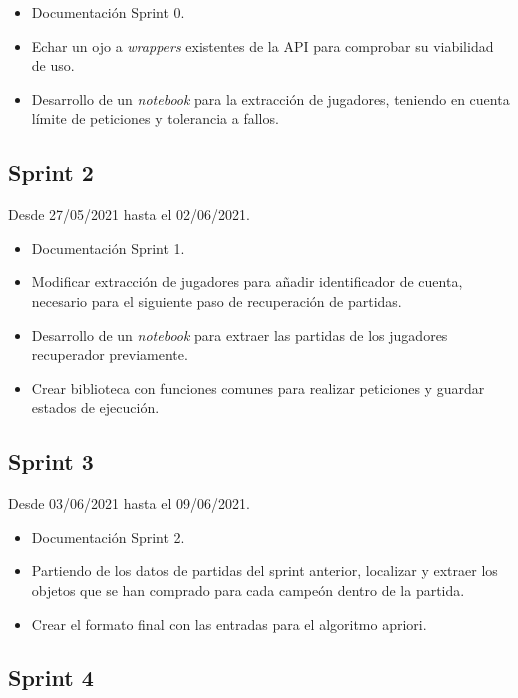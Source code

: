 \begin{itemize}
    \item Documentación Sprint 0.
    \item Echar un ojo a \textit{wrappers} existentes de la API para comprobar su viabilidad de uso.
    \item Desarrollo de un \textit{notebook} para la extracción de jugadores, teniendo en cuenta límite de peticiones y tolerancia a fallos.
\end{itemize}

\subsection{Sprint 2}

Desde 27/05/2021 hasta el 02/06/2021.

\begin{itemize}
    \item Documentación Sprint 1.
    \item Modificar extracción de jugadores para añadir identificador de cuenta, necesario para el siguiente paso de recuperación de partidas.
    \item Desarrollo de un \textit{notebook} para extraer las partidas de los jugadores recuperador previamente.
    \item Crear biblioteca con funciones comunes para realizar peticiones y guardar estados de ejecución.
\end{itemize}

\subsection{Sprint 3}

Desde 03/06/2021 hasta el 09/06/2021.

\begin{itemize}
    \item Documentación Sprint 2.
    \item Partiendo de los datos de partidas del sprint anterior, localizar y extraer los objetos que se han comprado para cada campeón dentro de la partida.
    \item Crear el formato final con las entradas para el algoritmo apriori.
\end{itemize}

\subsection{Sprint 4}

